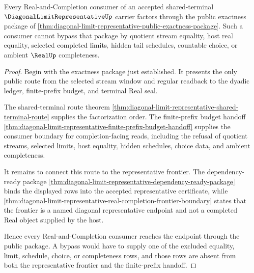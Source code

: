 \begin{theorem}
\label{thm:diagonal-limit-representative-completion-consumer-factorization}
Every Real-and-Completion consumer of an accepted shared-terminal $\DiagonalLimitRepresentativeUp$ carrier factors through the public exactness package of \autoref{thm:diagonal-limit-representative-public-exactness-package}. Such a consumer cannot bypass that package by quotient stream equality, host real equality, selected completed limits, hidden tail schedules, countable choice, or ambient $\RealUp$ completeness.
\end{theorem}
\begin{proof}
Begin with the exactness package just established. It presents the only public route from the selected stream window and regular readback to the dyadic ledger, finite-prefix budget, and terminal Real seal.

The shared-terminal route theorem \autoref{thm:diagonal-limit-representative-shared-terminal-route} supplies the factorization order. The finite-prefix budget handoff \autoref{thm:diagonal-limit-representative-finite-prefix-budget-handoff} supplies the consumer boundary for completion-facing reads, including the refusal of quotient streams, selected limits, host equality, hidden schedules, choice data, and ambient completeness.

It remains to connect this route to the representative frontier. The dependency-ready package \autoref{thm:diagonal-limit-representative-dependency-ready-package} binds the displayed rows into the accepted representative certificate, while \autoref{thm:diagonal-limit-representative-real-completion-frontier-boundary} states that the frontier is a named diagonal representative endpoint and not a completed Real object supplied by the host.

Hence every Real-and-Completion consumer reaches the endpoint through the public package. A bypass would have to supply one of the excluded equality, limit, schedule, choice, or completeness rows, and those rows are absent from both the representative frontier and the finite-prefix handoff.
\end{proof}

